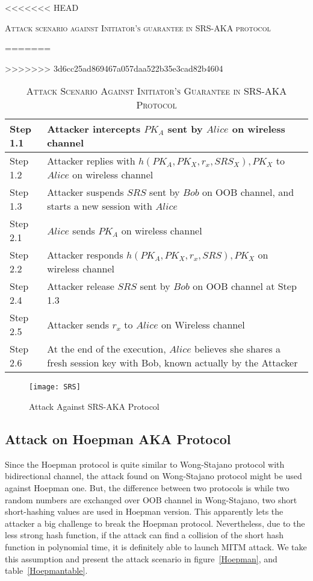 \begin{enumerate}
\begin{enumerate}
\begin{table}[t]
\centering
<<<<<<< HEAD
\caption{\textsc{Attack scenario against Initiator's guarantee in SRS-AKA protocol}}
=======
\caption{\textsc{Attack Scenario Against Initiator's Guarantee in SRS-AKA Protocol}}
>>>>>>> 3d6cc25ad869467a057daa522b35e3cad82b4604
\label{SRSattacktable}
{\small
\begin{tabular}{| l | p{11cm} |}
 \hline
 Step 1.1 & Attacker intercepts $PK_A$ sent by $Alice$ on wireless channel\\ \hline
 Step 1.2 & Attacker replies with $h(PK_A,PK_X,r_x,SRS_X), PK_X$ to $Alice$ on wireless channel\\ \hline
 Step 1.3 & Attacker suspends $SRS$ sent by $Bob$ on OOB channel, and starts a new session with $Alice$\\ \hline \hline
 Step 2.1 & $Alice$ sends $PK_A$ on wireless channel\\ \hline
 Step 2.2 & Attacker responds $h(PK_A,PK_X,r_x,SRS), PK_X$  on wireless channel\\ \hline
 Step 2.4 & Attacker release $SRS$ sent by $Bob$ on OOB channel at Step 1.3\\ \hline
 Step 2.5 & Attacker sends $r_x$ to $Alice$ on Wireless channel\\ \hline
 Step 2.6 & At the end of the execution, $Alice$ believes she shares a fresh session key with Bob, known actually by the Attacker\\ \hline
\end{tabular}
}
\end{table}

\begin{figure}
  \centering
  \texttt{[image: SRS]}
  \caption{Attack Against SRS-AKA Protocol}
  \label{SRSattack}
\end{figure}


\subsection{Attack on Hoepman AKA Protocol}

Since the Hoepman protocol is quite similar to Wong-Stajano protocol with bidirectional channel, the attack found on Wong-Stajano protocol might be used against Hoepman one. But, the difference between two protocols is while two random numbers are exchanged over OOB channel in Wong-Stajano, two short short-hashing values are used in Hoepman version. This apparently lets the attacker a big challenge to break the Hoepman protocol. Nevertheless, due to the less strong hash function, if the attack can find a collision of the short hash function in polynomial time, it is definitely able to launch MITM attack. We take this assumption and present the attack scenario in figure~\ref{Hoepman}, and table~\ref{Hoepmantable}. 
   

\end{enumerate}
\end{enumerate}
